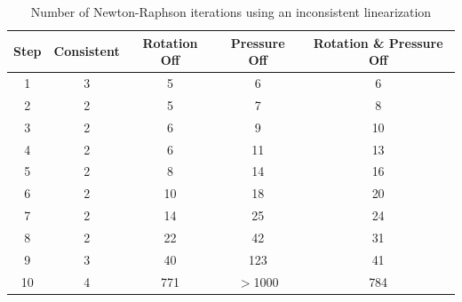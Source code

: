 \begin{table}[]
\centering
\caption{Number of Newton-Raphson iterations using an inconsistent linearization}
\label{tab.ring_tangents}
\begin{tabular}{|c|c|c|c|c|}
\hline
Step & Consistent & Rotation Off & Pressure Off & Rotation \& Pressure Off \\ \hline
1  & 3 & 5   & 6  & 6 \\ \hline
2  & 2 & 5   & 7  & 8 \\ \hline
3  & 2 & 6   & 9  & 10 \\ \hline
4  & 2 & 6   & 11 & 13 \\ \hline
5  & 2 & 8   & 14 & 16 \\ \hline
6  & 2 & 10  & 18 & 20 \\ \hline
7  & 2 & 14  & 25 & 24 \\ \hline
8  & 2 & 22  & 42 & 31 \\ \hline
9  & 3 & 40  & 123 & 41 \\ \hline
10 & 4 & 771 & $>$1000 & 784 \\ \hline
\end{tabular}
\end{table}